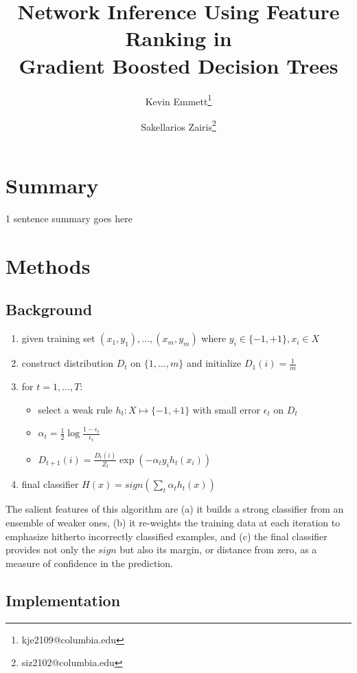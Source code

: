 \documentclass[letterpaper, 11pt]{article}
\title{Network Inference Using Feature Ranking in\\Gradient Boosted Decision Trees}
\author[1]{Kevin Emmett\thanks{kje2109@columbia.edu}}
\author[2]{Sakellarios Zairis\thanks{siz2102@columbia.edu}}
\affil[1]{Department of Physics, Columbia University}
\affil[2]{Department of Computational Biology \& Bioinformatics, Columbia University}
\begin{document}
\maketitle

\section{Summary}

1 sentence summary goes here

\section{Methods}

\subsection{Background}
 
\begin{enumerate}
\item given training set $(x_1,y_1), ..., (x_m,y_m)$ where $y_i \in \{-1,+1\}, x_i \in X$
\item construct distribution $D_t$ on $\{1, ..., m\}$ and initialize $D_1(i) = \frac{1}{m}$
\item for $t = 1, ..., T$:
\begin{itemize}
\item select a weak rule $h_t : X \mapsto \{-1,+1\}$ with small error $\epsilon_t$ on $D_t$
\item $\alpha_t = \frac{1}{2} \log \frac{1 - \epsilon_t}{\epsilon_t}$
\item $D_{t+1}(i) = \frac{D_t(i)}{Z_t} \exp (-\alpha_t y_i h_t(x_i))$
\end{itemize}
\item final classifier $H(x) = sign( \sum_t \alpha_t h_t(x) )$
\end{enumerate}

The salient features of this algorithm are (a) it builds a strong classifier from an ensemble of weaker ones, (b) it re-weights the training data at each iteration to emphasize hitherto incorrectly classified examples, and (c) the final classifier provides not only the $sign$ but also its margin, or distance from zero, as a measure of confidence in the prediction.

\subsection{Implementation}
\end{document}
